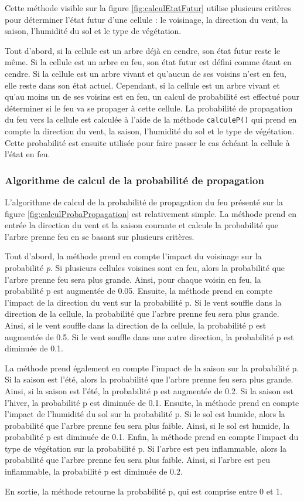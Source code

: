 Cette méthode visible sur la figure \ref{fig:calculEtatFutur} utilise plusieurs critères pour déterminer l'état futur d'une cellule : le voisinage, la direction du vent, la saison, l'humidité du sol et le type de végétation.

Tout d'abord, si la cellule est un arbre déjà en cendre, son état futur reste le même. Si la cellule est un arbre en feu, son état futur est défini comme étant en cendre. Si la cellule est un arbre vivant et qu'aucun de ses voisins n'est en feu, elle reste dans son état actuel. Cependant, si la cellule est un arbre vivant et qu'au moins un de ses voisins est en feu, un calcul de probabilité est effectué pour déterminer si le feu va se propager à cette cellule. La probabilité de propagation du feu vers la cellule est calculée à l'aide de la méthode \texttt{calculeP()} qui prend en compte la direction du vent, la saison, l'humidité du sol et le type de végétation. Cette probabilité est ensuite utilisée pour faire passer le cas échéant la cellule à l'état en feu.

\subsubsection{Algorithme de calcul de la probabilité de propagation}

L'algorithme de calcul de la probabilité de propagation du feu présenté sur la figure \ref{fig:calculProbaPropagation} est relativement simple. La méthode prend en entrée la direction du vent et la saison courante et calcule la probabilité que l'arbre prenne feu en se basant sur plusieurs critères.

Tout d'abord, la méthode prend en compte l'impact du voisinage sur la probabilité \textit{p}. Si plusieurs cellules voisines sont en feu, alors la probabilité que l'arbre prenne feu sera plus grande. Ainsi, pour chaque voisin en feu, la probabilité p est augmentée de 0.05. Ensuite, la méthode prend en compte l'impact de la direction du vent sur la probabilité p. Si le vent souffle dans la direction de la cellule, la probabilité que l'arbre prenne feu sera plus grande. Ainsi, si le vent souffle dans la direction de la cellule, la probabilité p est augmentée de 0.5. Si le vent souffle dans une autre direction, la probabilité p est diminuée de 0.1.

La méthode prend également en compte l'impact de la saison sur la probabilité p. Si la saison est l'été, alors la probabilité que l'arbre prenne feu sera plus grande. Ainsi, si la saison est l'été, la probabilité p est augmentée de 0.2. Si la saison est l'hiver, la probabilité p est diminuée de 0.1. Ensuite, la méthode prend en compte l'impact de l'humidité du sol sur la probabilité p. Si le sol est humide, alors la probabilité que l'arbre prenne feu sera plus faible. Ainsi, si le sol est humide, la probabilité p est diminuée de 0.1. Enfin, la méthode prend en compte l'impact du type de végétation sur la probabilité p. Si l'arbre est peu inflammable, alors la probabilité que l'arbre prenne feu sera plus faible. Ainsi, si l'arbre est peu inflammable, la probabilité p est diminuée de 0.2.

En sortie, la méthode retourne la probabilité p, qui est comprise entre 0 et 1.